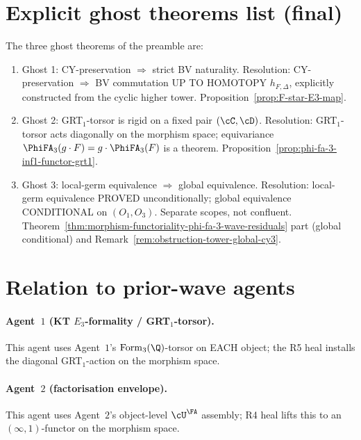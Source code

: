 \section*{Explicit ghost theorems list (final)}

The three ghost theorems of the preamble are:
\begin{enumerate}
\item Ghost 1: CY-preservation $\Rightarrow$ strict BV naturality.
     Resolution: CY-preservation $\Rightarrow$ BV commutation UP TO
     HOMOTOPY $h_{F, \Delta}$, explicitly constructed from the cyclic
     higher tower.  Proposition~\ref{prop:F-star-E3-map}.
\item Ghost 2: GRT$_1$-torsor is rigid on a fixed pair
     $(\cC, \cD)$.  Resolution: GRT$_1$-torsor acts diagonally on the
     morphism space; equivariance $\PhiFA_3(g \cdot F) = g \cdot
     \PhiFA_3(F)$ is a theorem.
     Proposition~\ref{prop:phi-fa-3-inf1-functor-grt1}.
\item Ghost 3: local-germ equivalence $\Rightarrow$ global equivalence.
     Resolution: local-germ equivalence PROVED unconditionally;
     global equivalence CONDITIONAL on $(O_1, O_3)$.  Separate
     scopes, not confluent.
     Theorem~\ref{thm:morphism-functoriality-phi-fa-3-wave-residuals}
     part (global conditional) and
     Remark~\ref{rem:obstruction-tower-global-cy3}.
\end{enumerate}

\section*{Relation to prior-wave agents}

\paragraph{Agent~$1$ (KT $E_3$-formality / GRT$_1$-torsor).}  This
agent uses Agent~$1$'s $\mathrm{Form}_3(\Q)$-torsor on EACH object; the
R5 heal installs the diagonal GRT$_1$-action on the morphism space.

\paragraph{Agent~$2$ (factorisation envelope).}  This agent uses
Agent~$2$'s object-level $\cU^\FA$ assembly; R4 heal lifts this to an
$(\infty,1)$-functor on the morphism space.


